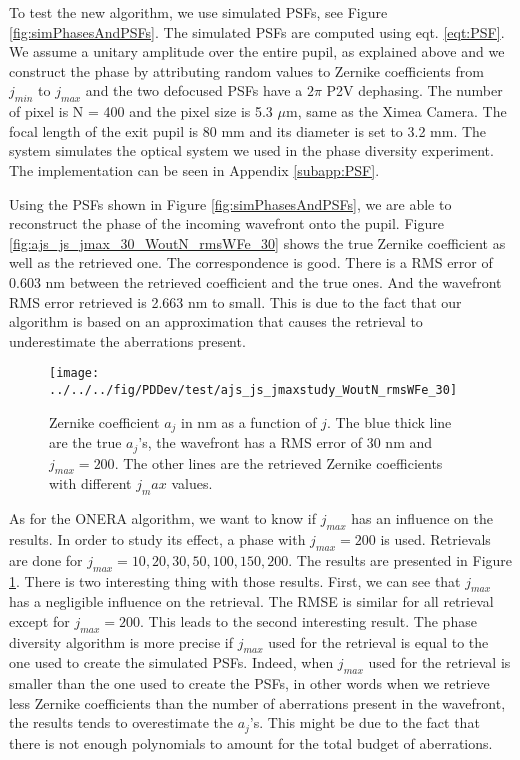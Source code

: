 To test the new algorithm, we use simulated PSFs, see Figure \ref{fig:simPhasesAndPSFs}. The simulated PSFs are computed using eqt. \eqref{eqt:PSF}. We assume a unitary amplitude over the entire pupil, as explained above and we construct the phase by attributing random values to Zernike coefficients from $j_{min}$ to $j_{max}$ and the two defocused PSFs have a $2\pi$ P2V dephasing. The number of pixel is N = 400 and the pixel size is 5.3 $\mu$m, same as the Ximea Camera. The focal length of the exit pupil is 80 mm and its diameter is set to 3.2 mm. The system simulates the optical system we used in the phase diversity experiment. The implementation can be seen in Appendix \ref{subapp:PSF}. 

Using the PSFs shown in Figure \ref{fig:simPhasesAndPSFs}, we are able to reconstruct the phase of the incoming wavefront onto the pupil. Figure \ref{fig:ajs_js_jmax_30_WoutN_rmsWFe_30} shows the true Zernike coefficient as well as the retrieved one. The correspondence is good. There is a RMS error of 0.603 nm between the retrieved coefficient and the true ones. And the wavefront RMS error retrieved is 2.663 nm to small. This is due to the fact that our algorithm is based on an approximation that causes the retrieval to underestimate the aberrations present.

\begin{figure}
\begin{center}
\texttt{[image: ../../../fig/PDDev/test/ajs\_js\_jmaxstudy\_WoutN\_rmsWFe\_30]}
\decoRule
\caption{Zernike coefficient $a_j$ in nm as a function of $j$. The blue thick line are the true $a_j$'s, the wavefront has a RMS error of 30 nm and $j_{max}= 200$. The other lines are the retrieved Zernike coefficients with different $j_max$ values.}
\label{fig:ajs_js_jmaxstudy_WoutN_rmsWFe_30}
\end{center}
\end{figure}

As for the ONERA algorithm, we want to know if $j_{max}$ has an influence on the results. In order to study its effect, a phase with $j_{max} = 200$ is used. Retrievals are done for $j_{max} = 10, 20 , 30, 50,100,150,200$. The results are presented in Figure \ref{fig:ajs_js_jmaxstudy_WoutN_rmsWFe_30}. There is two interesting thing with those results. First, we can see that $j_{max}$ has a negligible influence on the retrieval. The RMSE is similar for all retrieval except for $j_{max} = 200$. This leads to the second interesting result. The phase diversity algorithm is more precise if $j_{max}$ used for the retrieval is equal to the one used to create the simulated PSFs. Indeed, when $j_{max}$ used for the retrieval is smaller than the one used to create the PSFs, in other words when we retrieve less Zernike coefficients than the number of aberrations present in the wavefront, the results tends to overestimate the $a_j$'s. This might be due to the fact that there is not enough polynomials to amount for the total budget of aberrations.


